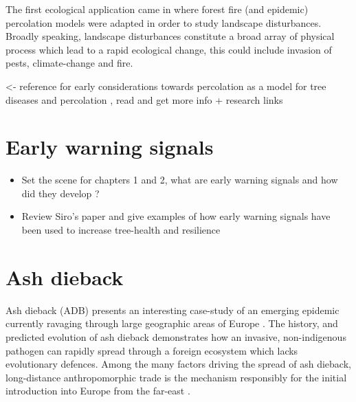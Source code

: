 The first ecological application came in \cite{pub.1031591030} where forest fire (and epidemic) percolation models were adapted in order to study landscape disturbances. Broadly speaking, landscape disturbances constitute a broad array of physical process which lead to a rapid ecological change, this could include invasion of pests, climate-change and fire.

\textemdash \cite{GRASSBERGER1983157} <- reference for early considerations towards percolation as a model for tree diseases and percolation
\textemdash \cite{SANDER2002293}, read and get more info + research links

\section{Early warning signals}

\label{section:ews}
\begin{itemize}
    \item Set the scene for chapters 1 and 2, what are early warning signals and how did they develop ?
    \item Review Siro's paper and give examples of how early warning signals have been used to increase tree-health and resilience 
\end{itemize}


\section{Ash dieback}




\label{ch2:ash-dieback}
Ash dieback (ADB) presents an interesting case-study of an emerging epidemic currently ravaging through large geographic areas of Europe \cite{enderle2019overview}.
The history, and predicted evolution of ash dieback demonstrates how an invasive, non-indigenous pathogen can rapidly spread through a foreign ecosystem which lacks evolutionary defences.
Among the many factors driving the spread of ash dieback, long-distance anthropomorphic trade is the mechanism responsibly for the initial introduction into Europe from the far-east \cite{zhao2013hymenoscyphus, queloz2011cryptic}.

